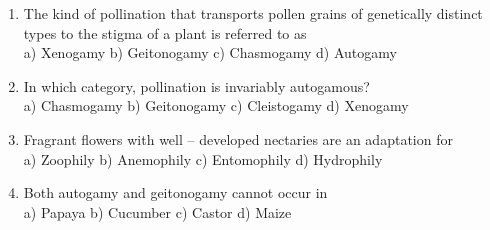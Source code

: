 \begin{enumerate}
\item
  The kind of pollination that transports pollen grains of genetically
  distinct types to the stigma of a plant is referred to as\\
  a) Xenogamy b) Geitonogamy c) Chasmogamy d) Autogamy
\item
  In which category, pollination is invariably autogamous?\\
  a) Chasmogamy b) Geitonogamy c) Cleistogamy d) Xenogamy
\item
  Fragrant flowers with well -- developed nectaries are an adaptation
  for\\
  a) Zoophily b) Anemophily c) Entomophily d) Hydrophily
\item
  Both autogamy and geitonogamy cannot occur in\\
  a) Papaya b) Cucumber c) Castor d) Maize
\end{enumerate}
